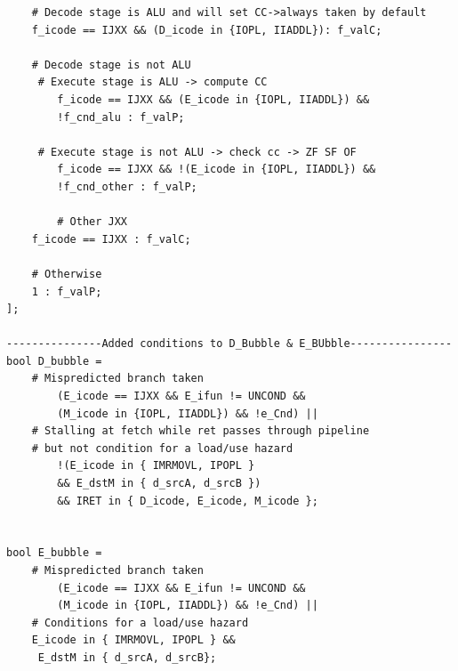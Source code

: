 \documentclass[12pt,a4paper]{article}
\begin{document}
\begin{lstlisting}
	# Decode stage is ALU and will set CC->always taken by default
	f_icode == IJXX && (D_icode in {IOPL, IIADDL}): f_valC;

	# Decode stage is not ALU
	 # Execute stage is ALU -> compute CC
        f_icode == IJXX && (E_icode in {IOPL, IIADDL}) && 
        !f_cnd_alu : f_valP;

	 # Execute stage is not ALU -> check cc -> ZF SF OF
        f_icode == IJXX && !(E_icode in {IOPL, IIADDL}) && 
        !f_cnd_other : f_valP;
        
        # Other JXX
	f_icode == IJXX : f_valC;

	# Otherwise
	1 : f_valP;
];

---------------Added conditions to D_Bubble & E_BUbble----------------
bool D_bubble =
	# Mispredicted branch taken
        (E_icode == IJXX && E_ifun != UNCOND && 
        (M_icode in {IOPL, IIADDL}) && !e_Cnd) ||
	# Stalling at fetch while ret passes through pipeline
	# but not condition for a load/use hazard
        !(E_icode in { IMRMOVL, IPOPL } 
        && E_dstM in { d_srcA, d_srcB }) 
        && IRET in { D_icode, E_icode, M_icode };


bool E_bubble =
	# Mispredicted branch taken
        (E_icode == IJXX && E_ifun != UNCOND && 
        (M_icode in {IOPL, IIADDL}) && !e_Cnd) ||
	# Conditions for a load/use hazard
	E_icode in { IMRMOVL, IPOPL } &&
	 E_dstM in { d_srcA, d_srcB};
\end{lstlisting}
\end{document}
